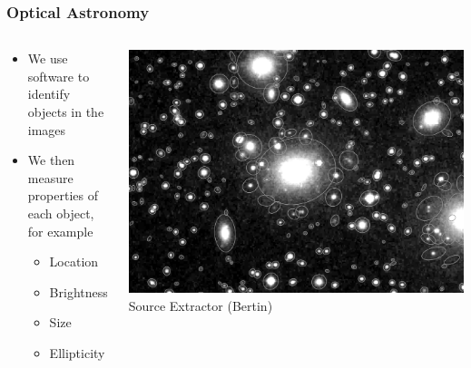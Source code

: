 \documentclass{beamer}
\begin{document}
\frame
{

    \frametitle{Optical Astronomy}


    \begin{columns}
        \begin{column}{0.5\textwidth}
            \begin{itemize}


                \item We use software to identify objects in the images

                \item We then measure properties of each object, for example

                    \begin{itemize}
                        \item Location
                        \item Brightness
                        \item Size
                        \item Ellipticity
                    \end{itemize}

            \end{itemize}
        \end{column}
        \begin{column}{0.5\textwidth}
            \begin{center}
                \includegraphics[width=\textwidth]{sun226_fig.png}
                \newline
                {\tiny Source Extractor (Bertin)}
            \end{center}

            
        \end{column}
    \end{columns}


}
\end{document}

